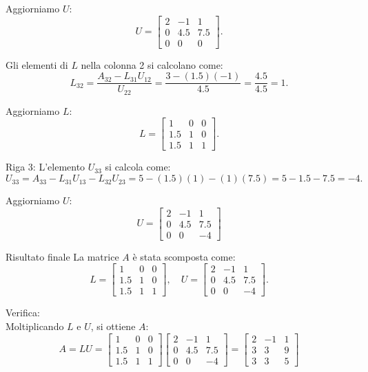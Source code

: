 {    Aggiorniamo \( U \):
    \[
    U = \begin{bmatrix}
            2 & -1 & 1 \\
            0 & 4.5 & 7.5 \\
            0 & 0 & 0
        \end{bmatrix}.
    \]

    Gli elementi di \( L \) nella colonna 2 si calcolano come:
    \[
        L_{32} = \frac{A_{32} - L_{31}U_{12}}{U_{22}} = \frac{3 - (1.5)(-1)}{4.5} = \frac{4.5}{4.5} = 1.
    \]

    Aggiorniamo \( L \):
    \[
        L = \begin{bmatrix}
            1 & 0 & 0 \\
            1.5 & 1 & 0 \\
            1.5 & 1 & 1
        \end{bmatrix}.
    \]

    Riga 3:
    L'elemento \( U_{33} \) si calcola come:
    \[
        U_{33} = A_{33} - L_{31}U_{13} - L_{32}U_{23} = 5 - (1.5)(1) - (1)(7.5) = 5 - 1.5 - 7.5 = -4.
    \]

    Aggiorniamo \( U \):
    \[
        U = \begin{bmatrix}
            2 & -1 & 1 \\
            0 & 4.5 & 7.5 \\
            0 & 0 & -4
        \end{bmatrix}
    \]

    Risultato finale
    La matrice \( A \) è stata scomposta come:
    \[
    L = \begin{bmatrix}
        1 & 0 & 0 \\
        1.5 & 1 & 0 \\
        1.5 & 1 & 1
    \end{bmatrix}, \quad
    U = \begin{bmatrix}
        2 & -1 & 1 \\
        0 & 4.5 & 7.5 \\
        0 & 0 & -4
    \end{bmatrix}.
    \]

    Verifica:\\
    Moltiplicando \( L \) e \( U \), si ottiene \( A \):
    \[
        A = LU = \begin{bmatrix}
            1 & 0 & 0 \\
            1.5 & 1 & 0 \\
            1.5 & 1 & 1
        \end{bmatrix}
        \begin{bmatrix}
            2 & -1 & 1 \\
            0 & 4.5 & 7.5 \\
            0 & 0 & -4
        \end{bmatrix}
        =
        \begin{bmatrix}
            2 & -1 & 1 \\
            3 & 3 & 9 \\
            3 & 3 & 5
        \end{bmatrix}
    \]
}


